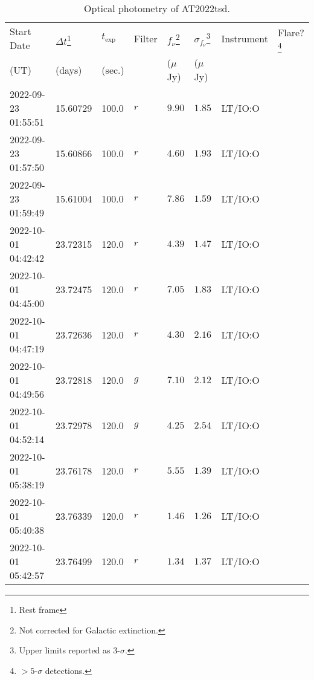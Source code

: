 \documentclass{nature_plusfigure}
\begin{document}
\clearpage

\begin{supplement}

\renewcommand{\thefigure}{Supplementary Information Figure~\arabic{figure}}
\renewcommand{\figurename}{}
\setcounter{figure}{0}
%


\renewcommand{\thetable}{Supplementary Information Table~\arabic{table}}
 \renewcommand{\tablename}{}
\setcounter{table}{0}

\begin{center} 
\begin{longtable}{llllllll} 
\caption{Optical photometry of AT2022tsd.} 
\label{tab:optical-photometry}\\ 
\hline\hline
Start Date & $\Delta t$\footnote{Rest frame} & $t_\mathrm{exp}$ & Filter & $f_\nu$\footnote{Not corrected for Galactic extinction.} & $\sigma_{f_\nu}$\footnote{Upper limits reported as 3-$\sigma$.} & Instrument & Flare?\footnote{$>5$-$\sigma$ detections.}\\ 
(UT) & (days) & (sec.) &  & ($\mu$Jy) & ($\mu$Jy) &  & \\ 
\hline
2022-09-23 01:55:51 & 15.60729 & 100.0 & $r$ & $9.90$ & $1.85$ & LT/IO:O &  \\ 
2022-09-23 01:57:50 & 15.60866 & 100.0 & $r$ & $4.60$ & $1.93$ & LT/IO:O &  \\ 
2022-09-23 01:59:49 & 15.61004 & 100.0 & $r$ & $7.86$ & $1.59$ & LT/IO:O &  \\ 
2022-10-01 04:42:42 & 23.72315 & 120.0 & $r$ & $4.39$ & $1.47$ & LT/IO:O &  \\ 
2022-10-01 04:45:00 & 23.72475 & 120.0 & $r$ & $7.05$ & $1.83$ & LT/IO:O &  \\ 
2022-10-01 04:47:19 & 23.72636 & 120.0 & $r$ & $4.30$ & $2.16$ & LT/IO:O &  \\ 
2022-10-01 04:49:56 & 23.72818 & 120.0 & $g$ & $7.10$ & $2.12$ & LT/IO:O &  \\ 
2022-10-01 04:52:14 & 23.72978 & 120.0 & $g$ & $4.25$ & $2.54$ & LT/IO:O &  \\ 
2022-10-01 05:38:19 & 23.76178 & 120.0 & $r$ & $5.55$ & $1.39$ & LT/IO:O &  \\ 
2022-10-01 05:40:38 & 23.76339 & 120.0 & $r$ & $1.46$ & $1.26$ & LT/IO:O &  \\ 
2022-10-01 05:42:57 & 23.76499 & 120.0 & $r$ & $1.34$ & $1.37$ & LT/IO:O &  \\ 

\end{longtable}
\end{center}
\end{supplement}
\end{document}
